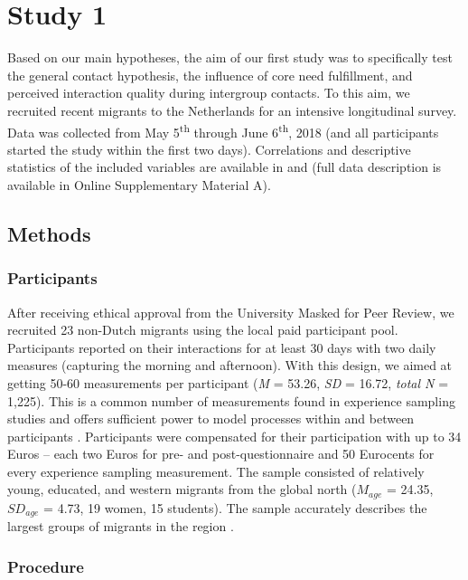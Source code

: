 \section{Study 1}

Based on our main hypotheses, the aim of our first study was to
specifically test the general contact hypothesis, the influence of core
need fulfillment, and perceived interaction quality during intergroup
contacts. To this aim, we recruited recent migrants to the Netherlands
for an intensive longitudinal survey. Data was collected from May
5\textsuperscript{th} through June 6\textsuperscript{th}, 2018 (and all
participants started the study within the first two days). Correlations
and descriptive statistics of the included variables are available in
 and  (full data
description is available in Online Supplementary Material A).

\subsection{Methods}

\subsubsection{Participants}

After receiving ethical approval from the University Masked for Peer
Review, we recruited 23 non-Dutch migrants using the local paid
participant pool. Participants reported on their interactions for at
least 30 days with two daily measures (capturing the morning and
afternoon). With this design, we aimed at getting 50-60 measurements per
participant (\textit{M} = 53.26, \textit{SD} = 16.72, \textit{total N} =
1,225). This is a common number of measurements found in experience
sampling studies and offers sufficient power to model processes within
and between participants \citep[e.g.,][]{AanhetRot2012}. Participants
were compensated for their participation with up to 34 Euros -- each two
Euros for pre- and post-questionnaire and 50 Eurocents for every
experience sampling measurement. The sample consisted of relatively
young, educated, and western migrants from the global north (\(M_{age}\)
= 24.35, \(SD_{age}\) = 4.73, 19 women, 15 students). The sample
accurately describes the largest groups of migrants in the region
\citep[][]{GemeenteGroningen2015}.

\subsubsection{Procedure}

